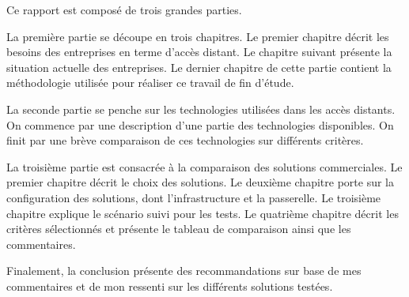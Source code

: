 Ce rapport est composé de trois grandes parties.

La première partie se découpe en trois chapitres.
Le premier chapitre décrit les besoins des entreprises en terme d'accès distant.
Le chapitre suivant présente la situation actuelle des entreprises.
Le dernier chapitre de cette partie contient la méthodologie utilisée pour réaliser ce travail de fin d'étude.

La seconde partie se penche sur les technologies utilisées dans les accès distants.
On commence par une description d'une partie des technologies disponibles.
On finit par une brève comparaison de ces technologies sur différents critères.

La troisième partie est consacrée à la comparaison des solutions commerciales.
Le premier chapitre décrit le choix des solutions.
Le deuxième chapitre porte sur la configuration des solutions, dont l'infrastructure et la passerelle.
Le troisième chapitre explique le scénario suivi pour les tests.
Le quatrième chapitre décrit les critères sélectionnés et présente le tableau de comparaison ainsi que les commentaires.

Finalement, la conclusion présente des recommandations sur base de mes commentaires et de mon ressenti sur les différents solutions testées.

